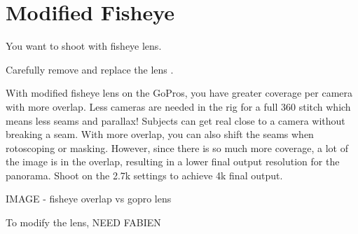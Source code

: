 \chapter{Modified Fisheye}
\pagecolor{white}
\label{chap:26}
\begin{fullwidth}

\problem

{\large You want to shoot with fisheye lens.  \par}


\solution

{\large Carefully remove and replace the lens .  
 \par}

With modified fisheye lens on the GoPros, you have greater coverage per camera with more overlap. Less cameras are needed in the rig for a full 360 stitch which means less seams and parallax! Subjects can get real close to a camera without breaking a seam. With more overlap, you can also shift the seams when rotoscoping or masking. However, since there is so much more coverage, a lot of the image is in the overlap, resulting in a lower final output resolution for the panorama. Shoot on the 2.7k settings to achieve 4k final output. 

IMAGE - fisheye overlap vs gopro lens

To modify the lens, NEED FABIEN




\clearpage
\end{fullwidth}
